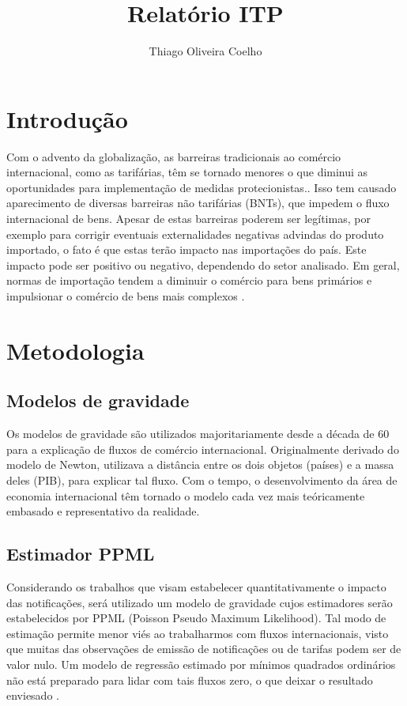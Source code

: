 \documentclass[12pt, a4paper]{article}
\title{Relatório ITP}
\author{Thiago Oliveira Coelho}
\begin{document}
\maketitle

\tableofcontents

\clearpage

\section{Introdução}

Com o advento da globalização, as barreiras tradicionais ao comércio internacional, como as tarifárias, têm se tornado menores o que diminui as oportunidades para implementação de medidas protecionistas.\cite{maskus2000quantifying}. Isso tem causado aparecimento de diversas barreiras não tarifárias (BNTs), que impedem o fluxo internacional de bens.
Apesar de estas barreiras poderem ser legítimas, por exemplo para corrigir eventuais externalidades negativas advindas do produto importado,  o fato é que estas terão impacto nas importações do país. Este impacto pode ser positivo ou negativo, dependendo do setor analisado. Em geral, normas de importação tendem a diminuir o comércio para bens primários e impulsionar o comércio de bens mais complexos \cite{moenius}.

\section{Metodologia}
\subsection{Modelos de gravidade}

Os modelos de gravidade são utilizados majoritariamente desde a década de 60 para a explicação de fluxos de comércio internacional. Originalmente derivado do modelo de Newton, utilizava a distância entre os dois objetos (países) e a massa deles (PIB), para explicar tal fluxo. Com o tempo, o desenvolvimento da área de economia internacional têm tornado o modelo cada vez mais teóricamente embasado e representativo da realidade. \cite{nascimento2013evoluccao}

\subsection{Estimador PPML}
Considerando os trabalhos que visam estabelecer quantitativamente o impacto das notificações, será utilizado um modelo de gravidade cujos estimadores serão estabelecidos por PPML (Poisson Pseudo Maximum Likelihood). Tal modo de estimação permite menor viés ao trabalharmos com fluxos internacionais, visto que muitas das observações de emissão de notificações ou de tarifas podem ser de valor nulo. Um modelo de regressão estimado por mínimos quadrados ordinários não está preparado para lidar com tais fluxos zero, o que deixar o resultado enviesado \cite{Log_Of_Gravity}.
\end{document}
